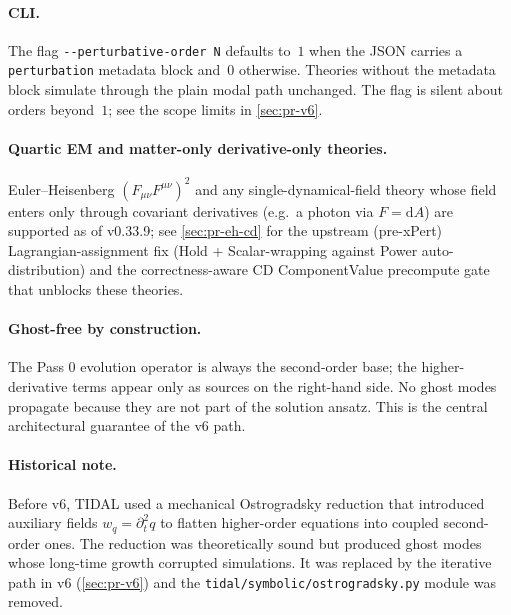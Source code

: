 \paragraph{CLI.} The flag \verb|--perturbative-order N| defaults to~$1$ when the JSON carries a \verb|perturbation| metadata block and~$0$ otherwise. Theories without the metadata block simulate through the plain modal path unchanged. The flag is silent about orders beyond~$1$; see the scope limits in \cref{sec:pr-v6}.

\paragraph{Quartic EM and matter-only derivative-only theories.} Euler--Heisenberg $(F_{\mu\nu}F^{\mu\nu})^2$ and any single-dynamical-field theory whose field enters only through covariant derivatives (e.g.\ a photon via $F = \mathrm{d}A$) are supported as of v0.33.9; see \cref{sec:pr-eh-cd} for the upstream (pre-xPert) Lagrangian-assignment fix (Hold + Scalar-wrapping against Power auto-distribution) and the correctness-aware CD ComponentValue precompute gate that unblocks these theories.

\paragraph{Ghost-free by construction.} The Pass 0 evolution operator is always the second-order base; the higher-derivative terms appear only as sources on the right-hand side. No ghost modes propagate because they are not part of the solution ansatz. This is the central architectural guarantee of the v6 path.

\paragraph{Historical note.} Before v6, TIDAL used a mechanical Ostrogradsky reduction that introduced auxiliary fields $w_q = \partial_t^2 q$ to flatten higher-order equations into coupled second-order ones. The reduction was theoretically sound but produced ghost modes whose long-time growth corrupted simulations. It was replaced by the iterative path in v6 (\cref{sec:pr-v6}) and the \verb|tidal/symbolic/ostrogradsky.py| module was removed.
